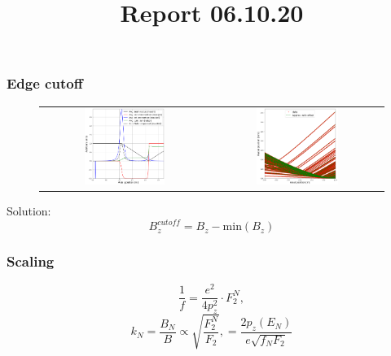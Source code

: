 \documentclass{beamer}
\title{Report 06.10.20}
\begin{document}


\begin{frame}
  \frametitle{Edge cutoff}
  \begin{figure}
    \begin{tabular}{cc}
      \includegraphics[width=0.5\textwidth]{uncutoff_field_durchgang} &
      \includegraphics[width=0.5\textwidth]{uncutoff_field_focal_traj}
    \end{tabular}
  \end{figure}
  Solution:
  \[
    B_z^{cutoff} = B_z - \text{min}(B_z)
  \]
\end{frame}

\begin{frame}
  \frametitle{Scaling}
  \[
    \frac{1}{f} = \frac{e^2}{4p_z^2}\cdot F_2^N, \]
\[    k_N = \frac{B_N}{B} \propto \sqrt{\frac{F_2^N}{F_2}}, = \frac{2p_z(E_N)}{e\sqrt{f_NF_2}}
  \]
\end{frame}
\end{document}
